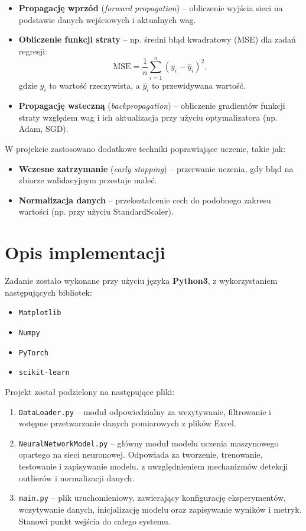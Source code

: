 \documentclass{classrep}
\begin{document}
\begin{itemize}
	\item \textbf{Propagację wprzód} (\textit{forward propagation}) -- obliczenie wyjścia sieci na podstawie danych wejściowych i aktualnych wag.
	\item \textbf{Obliczenie funkcji straty} -- np. średni błąd kwadratowy (MSE) dla zadań regresji:
	      \begin{equation}
		      \text{MSE} = \frac{1}{n} \sum_{i=1}^{n} (y_i - \hat{y}_i)^2,
	      \end{equation}
	      gdzie \( y_i \) to wartość rzeczywista, a \( \hat{y}_i \) to przewidywana wartość.
	\item \textbf{Propagację wsteczną} (\textit{backpropagation}) -- obliczenie gradientów funkcji straty względem wag i ich aktualizacja przy użyciu optymalizatora (np. Adam, SGD).
\end{itemize}

\noindent W projekcie zastosowano dodatkowe techniki poprawiające uczenie, takie jak:
\begin{itemize}
	\item \textbf{Wczesne zatrzymanie} (\textit{early stopping}) -- przerwanie uczenia, gdy błąd na zbiorze walidacyjnym przestaje maleć.
	\item \textbf{Normalizacja danych} -- przekształcenie cech do podobnego zakresu wartości (np. przy użyciu StandardScaler).
\end{itemize}
\clearpage{}
\section{Opis implementacji}

Zadanie zostało wykonane przy użyciu języka \textbf{Python3}, z wykorzystaniem następujących bibliotek:

\begin{itemize}
	\item \texttt{Matplotlib}
	\item \texttt{Numpy}
	\item \texttt{PyTorch}
	\item \texttt{scikit-learn}
\end{itemize}

Projekt został podzielony na następujące pliki:

\begin{enumerate}
	\item \texttt{DataLoader.py} – moduł odpowiedzialny za wczytywanie, filtrowanie i wstępne przetwarzanie danych pomiarowych z plików Excel.

	\item \texttt{NeuralNetworkModel.py} – główny moduł modelu uczenia maszynowego opartego na sieci neuronowej. Odpowiada za tworzenie, trenowanie, testowanie i zapisywanie modelu, z uwzględnieniem mechanizmów detekcji outlierów i normalizacji danych.

	\item \texttt{main.py} – plik uruchomieniowy, zawierający konfigurację eksperymentów, wczytywanie danych, inicjalizację modelu oraz zapisywanie wyników i metryk. Stanowi punkt wejścia do całego systemu.

\end{enumerate}
\end{document}
